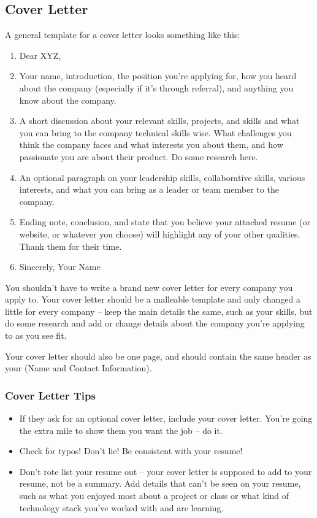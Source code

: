 \documentclass{article}
\begin{document}
\subsection{Cover Letter}
A general template for a cover letter looks something like this:
\begin{enumerate}
\item Dear XYZ,
\item Your name, introduction, the position you're applying for, how you heard
  about the company (especially if it's through referral), and anything you know
  about the company.
\item A short discussion about your relevant skills, projects, and skills and
  what you can bring to the company technical skills wise. What challenges you
  think the company faces and what interests you about them, and how passionate
  you are about their product. Do some research here.
\item An optional paragraph on your leadership skills, collaborative skills,
  various interests, and what you can bring as a leader or team member to the
  company.
\item Ending note, conclusion, and state that you believe your attached resume
  (or website, or whatever you choose) will highlight any of your other
  qualities. Thank them for their time.
\item Sincerely, Your Name
\end{enumerate}
You shouldn't have to write a brand new cover letter for every company you apply
to. Your cover letter should be a malleable template and only changed a little
for every company -- keep the main details the same, such as your skills, but do
some research and add or change details about the company you're applying to as
you see fit.

Your cover letter should also be one page, and should contain the same header as
your  (Name and Contact Information).

\subsubsection{Cover Letter Tips}
\begin{itemize}
\item If they ask for an optional cover letter, include your cover
  letter. You're going the extra mile to show them you want the job -- do it.
\item Check for typos! Don't lie! Be consistent with your resume!
\item Don't rote list your resume out -- your cover letter is supposed to add to
  your resume, not be a summary. Add details that can't be seen on your resume,
  such as what you enjoyed most about a project or class or what kind of
  technology stack you've worked with and are learning.
\end{itemize}
\end{document}
